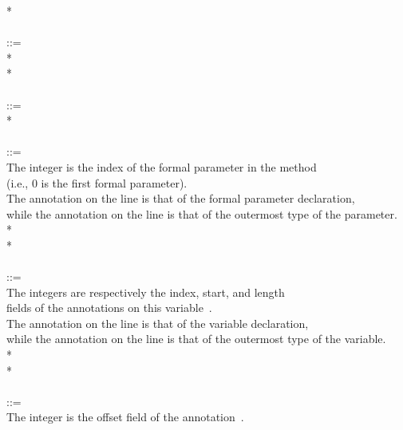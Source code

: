 \documentclass{article}
\begin{document}
\begin{tabbing}
\qquad    {}* \\
\\
 ::=  \\
\qquad    {} * \lineend \\
\qquad        {}* \\
\\
 ::=  \\
\qquad    {} * \lineend \\
\\
 ::= \\
\qquad    \bnfcmt The integer is the index of the formal parameter in the method \\
\qquad    \bnfcmt (i.e., 0 is the first formal parameter). \\
\qquad    \bnfcmt The annotation on the  line is that of the formal parameter declaration, \\
\qquad    \bnfcmt while the annotation on the  line is that of the outermost type of the parameter. \\
\qquad    {}  \bnflit{:} * \lineend \\
\qquad    {}* \\
\\
 ::= \\
\qquad    \bnfcmt The integers are respectively the index, start, and length \\
\qquad    \bnfcmt fields of the annotations on this variable~\cite{JSR308}. \\
\qquad    \bnfcmt The annotation on the  line is that of the variable declaration, \\
\qquad    \bnfcmt while the annotation on the  line is that of the outermost type of the variable. \\
\qquad    {}  \bnflit{\#}  \bnflit{+}  \bnflit{:} * \lineend \\
\qquad    {}* \\
\\
 ::= \\
\qquad    \bnfcmt The integer is the offset field of the annotation~\cite{JSR308}. \\

\end{tabbing}
\end{document}
